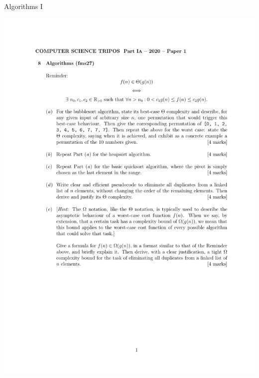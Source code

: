 \documentclass{tripos}  %
\begin{document}
\begin{question}[MockIA,year=2024,paper=1,question=7,author=rrw]{Algorithms I}

 \includegraphics[scale=0.95]{ia-7-question.pdf}
  
  
\end{question}
\end{document}
